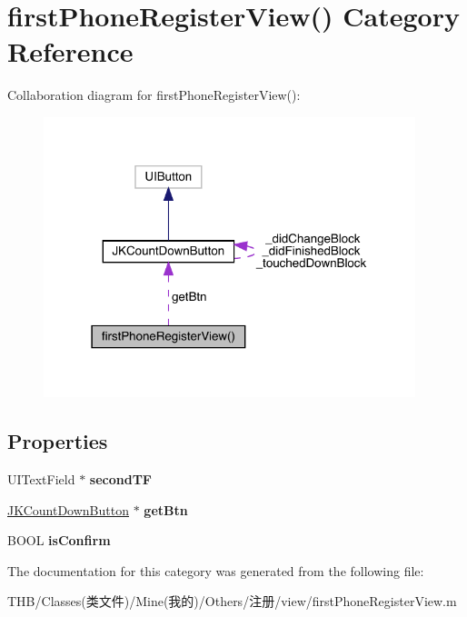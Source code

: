 \hypertarget{categoryfirst_phone_register_view_07_08}{}\section{first\+Phone\+Register\+View() Category Reference}
\label{categoryfirst_phone_register_view_07_08}


Collaboration diagram for first\+Phone\+Register\+View()\+:\nopagebreak
\begin{figure}[H]
\begin{center}
\leavevmode
\includegraphics[width=307pt]{categoryfirst_phone_register_view_07_08__coll__graph}
\end{center}
\end{figure}
\subsection*{Properties}
\begin{DoxyCompactItemize}
\item 
\mbox{\label{categoryfirst_phone_register_view_07_08_a046cee64c452cf19c3297a51d57e0cb2}} 
U\+I\+Text\+Field $\ast$ {\bfseries second\+TF}
\item 
\mbox{\label{categoryfirst_phone_register_view_07_08_a62d3bf10f08aaebc8c98d9b10826ee50}} 
\mbox{\hyperlink{interface_j_k_count_down_button}{J\+K\+Count\+Down\+Button}} $\ast$ {\bfseries get\+Btn}
\item 
\mbox{\label{categoryfirst_phone_register_view_07_08_abed30fa8f31bc263fd49f41d61e0ef08}} 
B\+O\+OL {\bfseries is\+Confirm}
\end{DoxyCompactItemize}


The documentation for this category was generated from the following file\+:\begin{DoxyCompactItemize}
\item 
T\+H\+B/\+Classes(类文件)/\+Mine(我的)/\+Others/注册/view/first\+Phone\+Register\+View.\+m\end{DoxyCompactItemize}
